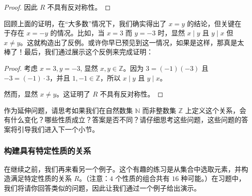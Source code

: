 \begin{example}
\begin{itemize}
\begin{proof}
            因此 $R$ 不具有反对称性。
        \end{proof}

        回顾上面的证明，在``大多数''情况下，我们确实得出了 $x = y$ 的结论，但关键在于存在 $x = -y$ 的情况。比如，当 $x = 3$ 而 $y = -3$ 时，显然 $x \mid y$ 且 $y \mid x$ 但 $x \ne y$。这就构造出了反例。或许你早已预见到这一情况，如果是这样，那真是太棒了！最后，我们通过展示这个反例来完成证明：
        \begin{proof}
            考虑 $x=3, y=-3$, 显然 $x, y \in \mathbb{Z}$。因为 $3 = (-1)(-3)$ 且 $-3 = (-1) \cdot 3$，并且 $1, -1 \in \mathbb{Z}$，所以 $x \mid y$ 且 $y \mid x$。

            然而，显然 $x \ne y$。这证明了 $R$ 不具有反对称性。
        \end{proof}
    \end{itemize}
\end{example}

作为延伸问题，请思考如果我们在自然数集 $\mathbb{N}$ 而非整数集 $\mathbb{Z}$ 上定义这个关系，会有什么变化？哪些性质成立？答案是否不同？请仔细思考这些问题，这些问题的答案将引导我们进入下一个小节。

\subsubsection*{构建具有特定性质的关系}

在继续之前，我们再来看另一个例子。这个有趣的练习是从集合中选取元素，并构造满足特定性质的关系 $R$。（注意：$4$ 个性质的组合共有 $16$ 种可能。）在习题中，我们将请你回答类似的问题，因此让我们通过一个例子给出演示。\\

